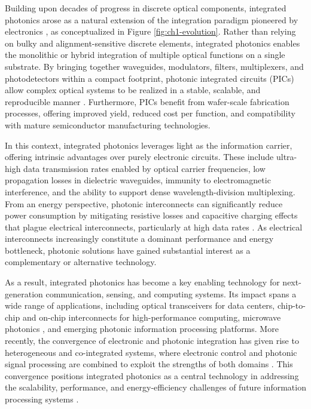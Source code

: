 Building upon decades of progress in discrete optical components, integrated photonics arose as a 
natural extension of the integration paradigm pioneered by electronics 
\cite{sorefPresentFutureSilicon2006}, as conceptualized in Figure \ref{fig:ch1-evolution}. Rather 
than relying on bulky and alignment-sensitive discrete elements, integrated photonics enables the 
monolithic or hybrid integration of multiple optical functions on a single substrate. By bringing 
together waveguides, modulators, filters, multiplexers, and photodetectors within a compact 
footprint, photonic integrated circuits (PICs) allow complex optical systems to be realized in a 
stable, scalable, and reproducible manner \cite{thomsonRoadmapSiliconPhotonics2016}. Furthermore, 
PICs benefit from wafer-scale fabrication processes, offering improved yield, reduced cost per 
function, and compatibility with mature semiconductor manufacturing technologies.

In this context, integrated photonics leverages light as the information carrier, offering 
intrinsic advantages over purely electronic circuits. These include ultra-high data transmission 
rates enabled by optical carrier frequencies, low propagation losses in dielectric waveguides, 
immunity to electromagnetic interference, and the ability to support dense wavelength-division 
multiplexing. From an energy perspective, photonic interconnects can significantly reduce power 
consumption by mitigating resistive losses and capacitive charging effects that plague electrical 
interconnects, particularly at high data rates 
\cite{millerRationaleChallengesOptical2000,millerDeviceRequirementsOptical2009}. As electrical 
interconnects increasingly constitute a dominant performance and energy bottleneck, photonic 
solutions have gained substantial interest as a complementary or alternative technology.

As a result, integrated photonics has become a key enabling technology for next-generation 
communication, sensing, and computing systems. Its impact spans a wide range of applications, 
including optical transceivers for data centers, chip-to-chip and on-chip interconnects for 
high-performance computing, microwave photonics \cite{capmanyMicrowavePhotonicsCombines2007,
sanchezModelingAmplifiedArbitrary2021}, and emerging photonic information processing platforms. 
More recently, the convergence of electronic and photonic integration has given rise to 
heterogeneous and co-integrated systems, where electronic control and photonic signal processing 
are combined to exploit the strengths of both domains \cite{youngOpticalTechnologyTeraScale2010,
jalaliSiliconPhotonics2006}. This convergence positions integrated photonics as a central 
technology in addressing the scalability, performance, and energy-efficiency challenges of future 
information processing systems \cite{perezReconfigurableLatticeMesh2016,
zhuangProgrammablePhotonicSignal2015}.

